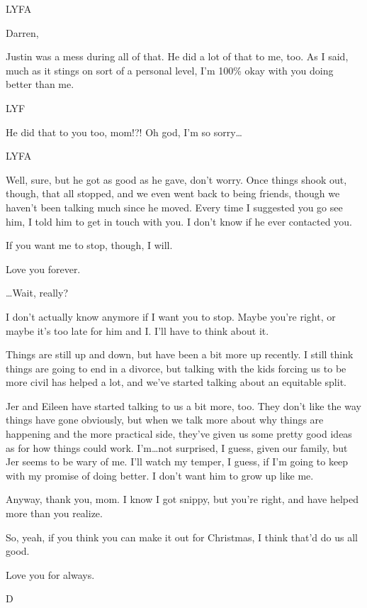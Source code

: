 LYFA

\secdiv{}\newpage

Darren,

Justin was a mess during all of that. He did a lot of that to me, too. As I said, much as it stings on sort of a personal level, I'm 100\% okay with you doing better than me.

LYF

\secdiv{}

He did that to you too, mom!?! Oh god, I'm so sorry\ldots{}

LYFA

\secdiv{}

Well, sure, but he got as good as he gave, don't worry. Once things shook out, though, that all stopped, and we even went back to being friends, though we haven't been talking much since he moved. Every time I suggested you go see him, I told him to get in touch with you. I don't know if he ever contacted you.

If you want me to stop, though, I will.

Love you forever.

\secdiv{}

\ldots{}Wait, really?

I don't actually know anymore if I want you to stop. Maybe you're right, or maybe it's too late for him and I. I'll have to think about it.

Things are still up and down, but have been a bit more up recently. I still think things are going to end in a divorce, but talking with the kids forcing us to be more civil has helped a lot, and we've started talking about an equitable split.\newpage

Jer and Eileen have started talking to us a bit more, too. They don't like the way things have gone obviously, but when we talk more about why things are happening and the more practical side, they've given us some pretty good ideas as for how things could work. I'm\ldots{}not surprised, I guess, given our family, but Jer seems to be wary of me. I'll watch my temper, I guess, if I'm going to keep with my promise of doing better. I don't want him to grow up like me.

Anyway, thank you, mom. I know I got snippy, but you're right, and have helped more than you realize.

So, yeah, if you think you can make it out for Christmas, I think that'd do us all good.

Love you for always.

D
